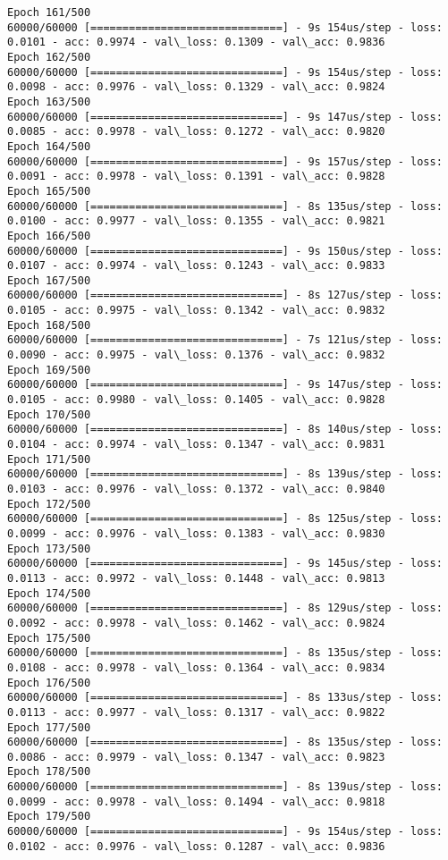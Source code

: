 \documentclass[11pt]{article}
\begin{document}
\begin{Verbatim}[commandchars=\\\{\}]
Epoch 161/500
60000/60000 [==============================] - 9s 154us/step - loss: 0.0101 - acc: 0.9974 - val\_loss: 0.1309 - val\_acc: 0.9836
Epoch 162/500
60000/60000 [==============================] - 9s 154us/step - loss: 0.0098 - acc: 0.9976 - val\_loss: 0.1329 - val\_acc: 0.9824
Epoch 163/500
60000/60000 [==============================] - 9s 147us/step - loss: 0.0085 - acc: 0.9978 - val\_loss: 0.1272 - val\_acc: 0.9820
Epoch 164/500
60000/60000 [==============================] - 9s 157us/step - loss: 0.0091 - acc: 0.9978 - val\_loss: 0.1391 - val\_acc: 0.9828
Epoch 165/500
60000/60000 [==============================] - 8s 135us/step - loss: 0.0100 - acc: 0.9977 - val\_loss: 0.1355 - val\_acc: 0.9821
Epoch 166/500
60000/60000 [==============================] - 9s 150us/step - loss: 0.0107 - acc: 0.9974 - val\_loss: 0.1243 - val\_acc: 0.9833
Epoch 167/500
60000/60000 [==============================] - 8s 127us/step - loss: 0.0105 - acc: 0.9975 - val\_loss: 0.1342 - val\_acc: 0.9832
Epoch 168/500
60000/60000 [==============================] - 7s 121us/step - loss: 0.0090 - acc: 0.9975 - val\_loss: 0.1376 - val\_acc: 0.9832
Epoch 169/500
60000/60000 [==============================] - 9s 147us/step - loss: 0.0105 - acc: 0.9980 - val\_loss: 0.1405 - val\_acc: 0.9828
Epoch 170/500
60000/60000 [==============================] - 8s 140us/step - loss: 0.0104 - acc: 0.9974 - val\_loss: 0.1347 - val\_acc: 0.9831
Epoch 171/500
60000/60000 [==============================] - 8s 139us/step - loss: 0.0103 - acc: 0.9976 - val\_loss: 0.1372 - val\_acc: 0.9840
Epoch 172/500
60000/60000 [==============================] - 8s 125us/step - loss: 0.0099 - acc: 0.9976 - val\_loss: 0.1383 - val\_acc: 0.9830
Epoch 173/500
60000/60000 [==============================] - 9s 145us/step - loss: 0.0113 - acc: 0.9972 - val\_loss: 0.1448 - val\_acc: 0.9813
Epoch 174/500
60000/60000 [==============================] - 8s 129us/step - loss: 0.0092 - acc: 0.9978 - val\_loss: 0.1462 - val\_acc: 0.9824
Epoch 175/500
60000/60000 [==============================] - 8s 135us/step - loss: 0.0108 - acc: 0.9978 - val\_loss: 0.1364 - val\_acc: 0.9834
Epoch 176/500
60000/60000 [==============================] - 8s 133us/step - loss: 0.0113 - acc: 0.9977 - val\_loss: 0.1317 - val\_acc: 0.9822
Epoch 177/500
60000/60000 [==============================] - 8s 135us/step - loss: 0.0086 - acc: 0.9979 - val\_loss: 0.1347 - val\_acc: 0.9823
Epoch 178/500
60000/60000 [==============================] - 8s 139us/step - loss: 0.0099 - acc: 0.9978 - val\_loss: 0.1494 - val\_acc: 0.9818
Epoch 179/500
60000/60000 [==============================] - 9s 154us/step - loss: 0.0102 - acc: 0.9976 - val\_loss: 0.1287 - val\_acc: 0.9836

\end{Verbatim}
\end{document}
